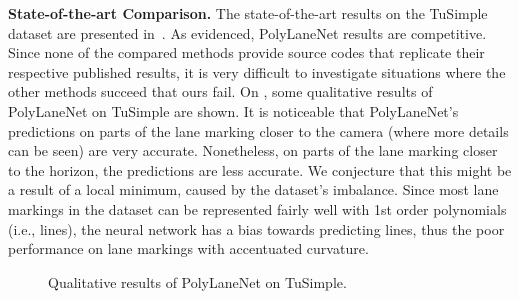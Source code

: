 \documentclass[a4paper,conference]{IEEEtran}
\newcommand{\methodname}{PolyLaneNet}
\begin{document}
\textbf{State-of-the-art Comparison.}
The state-of-the-art results on the TuSimple dataset are presented in~. As evidenced, \methodname{} results are competitive. Since none of the compared methods provide source codes that replicate their respective published results, it is very difficult to investigate situations where the other methods succeed that ours fail. On , some qualitative results of \methodname{} on TuSimple are shown. It is noticeable that \methodname{}'s predictions on parts of the lane marking closer to the camera (where more details can be seen) are very accurate. Nonetheless, on parts of the lane marking closer to the horizon, the predictions are less accurate. We conjecture that this might be a result of a local minimum, caused by the dataset's imbalance. Since most lane markings in the dataset can be represented fairly well with 1st order polynomials (i.e., lines), the neural network has a bias towards predicting lines, thus the poor performance on lane markings with accentuated curvature. 

\begin{figure}
	\centering
	\caption{Qualitative results of \methodname{} on TuSimple.}
	\label{fig:tusimple_qualitative}
\end{figure}
\end{document}
